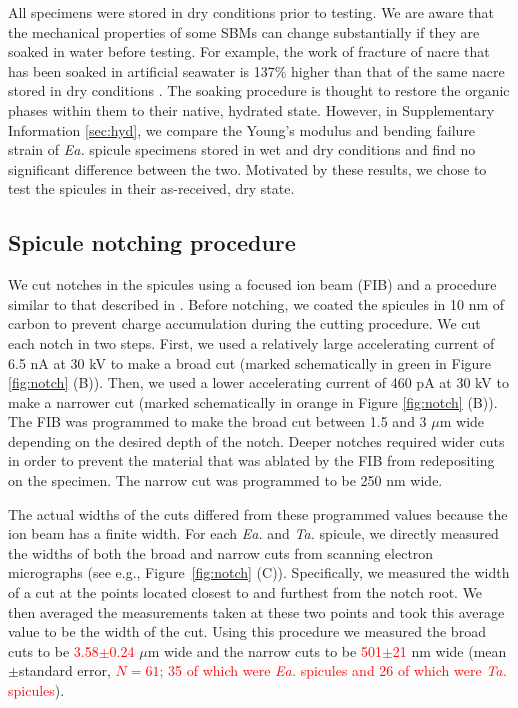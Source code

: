 \documentclass[12pt,onecolumn]{article}
\makeatletter
\newcommand{\TA}{\textit{Ta.\@}\xspace}
\newcommand{\EA}{\textit{Ea.\@}\xspace}
\makeatother
\begin{document}
\begin{bibunit}
All specimens were stored in dry conditions prior to testing. We are aware that the mechanical properties of some SBMs can change substantially if they are soaked in water before testing. For example, the work of fracture of nacre that has been soaked in artificial seawater is 137\% higher than that of the same nacre stored in dry conditions \cite{jackson1988}. The soaking procedure is thought to restore the organic phases within them to their native, hydrated state.  However, in Supplementary Information \ref{sec:hyd}, we compare the Young's modulus and bending failure strain of \EA spicule specimens stored in wet and dry conditions and find no significant difference between the two. Motivated by these results, we chose to test the spicules in their as-received, dry state.

\subsection{Spicule notching procedure}
\label{sec:notchconfig}
We cut notches in the spicules using a focused ion beam (FIB) and a procedure similar to that described in \cite{jaya2015can}. Before notching, we coated the spicules in 10 nm of carbon to prevent charge accumulation during the cutting procedure. We cut each notch in two steps. First, we used a relatively large accelerating current of 6.5 nA at 30 kV to make a broad cut (marked schematically in green in Figure \ref{fig:notch} (B)). Then, we used a lower accelerating current of 460 pA at 30 kV to make a narrower cut (marked schematically in orange in Figure \ref{fig:notch} (B)). The FIB was programmed to make the broad cut between 1.5 and 3 $\mu$m wide depending on the desired depth of the notch. Deeper notches required wider cuts in order to prevent the material that was ablated by the FIB from redepositing on the specimen. The narrow cut was programmed to be 250 nm wide. 

The actual widths of the cuts differed from these programmed values because the ion beam has a finite width. For each \EA and \TA spicule, we directly measured the widths of both the broad and narrow cuts from scanning electron micrographs (see e.g., Figure~\ref{fig:notch} (C)). Specifically, we measured the width of a cut at the points located closest to and furthest from the notch root. We then averaged the measurements taken at these two points and took this average value to be the width of the cut. Using this procedure we measured the broad cuts to be \textcolor{red}{3.58$\pm$0.24} $\mu$m wide and the narrow cuts to be \textcolor{red}{501$\pm$21} nm wide (mean$\pm$standard error, \textcolor{red}{$N=61$; 35 of which were \EA spicules and 26 of which were \TA spicules}).


\end{bibunit}
\end{document}
